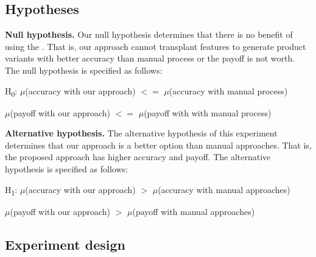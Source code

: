 \subsection{Hypotheses}

\textbf{Null hypothesis.} Our null hypothesis determines that there is no benefit of using the \FOUNDRY. That is, our approach cannot transplant features to generate product variants with better accuracy than manual process or the payoff is not worth. The null hypothesis is specified as follows:

\footnotesize\begin{center}H\textsubscript{0}: $\mu$(accuracy with our approach) $<=$ $\mu$(accuracy with manual process)

$\mu$(payoff with our approach) $<=$ $\mu$(payoff with with manual process)
\end{center}

\normalsize\textbf{Alternative hypothesis.} The alternative hypothesis of this experiment determines that our approach is a better option than manual approaches. That is, the proposed approach has higher accuracy and payoff. The alternative hypothesis is specified as follows:

\footnotesize\begin{center}H\textsubscript{1}: $\mu$(accuracy with our approach) $>$ $\mu$(accuracy with manual approaches)

$\mu$(payoff with our approach) $>$ $\mu$(payoff with manual approaches)
\end{center}



\normalsize\subsection{Experiment design}

